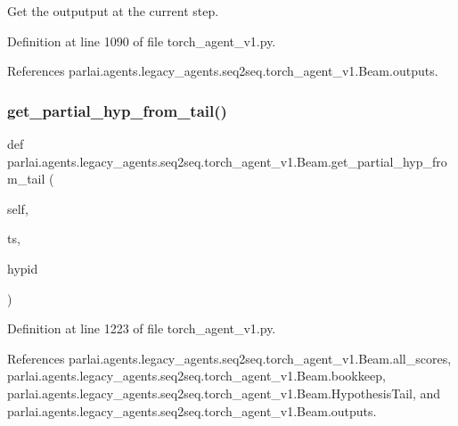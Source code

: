 \begin{DoxyVerb}Get the outputput at the current step.\end{DoxyVerb}
 

Definition at line 1090 of file torch\+\_\+agent\+\_\+v1.\+py.



References parlai.\+agents.\+legacy\+\_\+agents.\+seq2seq.\+torch\+\_\+agent\+\_\+v1.\+Beam.\+outputs.

\mbox{\label{classparlai_1_1agents_1_1legacy__agents_1_1seq2seq_1_1torch__agent__v1_1_1Beam_a94a3638f18c959a5a9223061ea9af77e}} 
\subsubsection{\texorpdfstring{get\+\_\+partial\+\_\+hyp\+\_\+from\+\_\+tail()}{get\_partial\_hyp\_from\_tail()}}
{\footnotesize\ttfamily def parlai.\+agents.\+legacy\+\_\+agents.\+seq2seq.\+torch\+\_\+agent\+\_\+v1.\+Beam.\+get\+\_\+partial\+\_\+hyp\+\_\+from\+\_\+tail (\begin{DoxyParamCaption}\item[{}]{self,  }\item[{}]{ts,  }\item[{}]{hypid }\end{DoxyParamCaption})}



Definition at line 1223 of file torch\+\_\+agent\+\_\+v1.\+py.



References parlai.\+agents.\+legacy\+\_\+agents.\+seq2seq.\+torch\+\_\+agent\+\_\+v1.\+Beam.\+all\+\_\+scores, parlai.\+agents.\+legacy\+\_\+agents.\+seq2seq.\+torch\+\_\+agent\+\_\+v1.\+Beam.\+bookkeep, parlai.\+agents.\+legacy\+\_\+agents.\+seq2seq.\+torch\+\_\+agent\+\_\+v1.\+Beam.\+Hypothesis\+Tail, and parlai.\+agents.\+legacy\+\_\+agents.\+seq2seq.\+torch\+\_\+agent\+\_\+v1.\+Beam.\+outputs.


